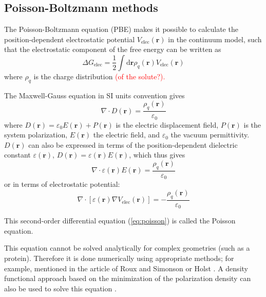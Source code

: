 \subsection{Poisson-Boltzmann methods\label{subsec:Poisson=002013Boltzmann-methods}}

The Poisson-Boltzmann equation (PBE) \citep{holst_1994_poisson} makes
it possible to calculate the position-dependent electrostatic potential
$V_{\mathrm{elec}}(\mathbf{r})$ in the continuum model, such that
the electrostatic component of the free energy can be written as
\begin{equation}
\Delta G_{\mathrm{elec}}=\frac{1}{2}\int\mathrm{d}\mathbf{r}\rho_{q}(\mathbf{r})V_{\mathrm{elec}}(\mathbf{r})
\end{equation}
where $\rho_{q}$ is the charge distribution \textcolor{red}{(of the
solute?).}

The Maxwell-Gauss equation in SI units convention gives
\begin{equation}
\nabla\cdot D(\mathbf{r})=\dfrac{\rho_{q}(\mathbf{r})}{\varepsilon_{0}}
\end{equation}
where $D(\mathbf{r})=\varepsilon_{0}E(\mathbf{r})+P(\mathbf{r})$
is the electric displacement field, $P(\mathbf{r})$ is the system
polarization, $E(\mathbf{r})$ the electric field, and $\varepsilon_{0}$
the vacuum permittivity. $D(\mathbf{r})$ can also be expressed in
terms of the position-dependent dielectric constant $\varepsilon(\mathbf{r})$,
$D(\mathbf{r})=\varepsilon(\mathbf{r})E(\mathbf{r})$, which thus
gives
\begin{equation}
\nabla\cdot\varepsilon(\mathbf{r})E(\mathbf{r})=\dfrac{\rho_{q}(\mathbf{r})}{\varepsilon_{0}}
\end{equation}
or in terms of electrostatic potential:
\begin{equation}
\nabla\cdot\left[\varepsilon(\mathbf{r})\nabla V_{\mathrm{elec}}(\mathbf{r})\right]=-\dfrac{\rho_{q}(\mathbf{r})}{\varepsilon_{0}}\label{eq:poisson}
\end{equation}

This second-order differential equation (\ref{eq:poisson}) is called
the Poisson equation. 

This equation cannot be solved analytically for complex geometries
(such as a protein). Therefore it is done numerically using appropriate
methods; for example, mentioned in the article of Roux and Simonson
\citep{roux_implicit_1999} or Holst \citep{holst_1994_poisson}.
A density functional approach based on the minimization of the polarization
density can also be used to solve this equation \citep{Marchi_2001,Levy_2005}.

